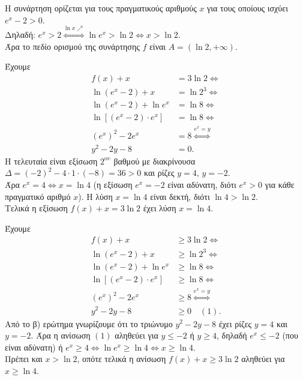 \begin{alist}
\item Η συνάρτηση ορίζεται για τους πραγματικούς αριθμούς $x$ για τους οποίους ισχύει $e^x - 2 > 0$. \\
Δηλαδή: $e^x > 2 \overset{\ln x \nearrow}{\iff} \ln e^x > \ln 2 \Leftrightarrow x > \ln 2$. \\
Άρα το πεδίο ορισμού της συνάρτησης $f$ είναι $A = (\ln 2, +\infty)$.
\item Έχουμε
\begin{align*}
f(x) + x &= 3\ln 2 \Leftrightarrow \\
\ln(e^x - 2) + x &= \ln 2^3 \Leftrightarrow \\
\ln(e^x - 2) + \ln e^x &= \ln 8 \Leftrightarrow \\
\ln\left[(e^x - 2)\cdot e^x\right] &= \ln 8 \Leftrightarrow \\
(e^x)^2 - 2e^x &= 8 \overset{e^x=y}{\iff} \\
y^2 - 2y - 8 &= 0.
\end{align*}
Η τελευταία είναι εξίσωση $2^{\text{ου}}$ βαθμού με διακρίνουσα $\Delta = (-2)^2 - 4\cdot 1\cdot (-8) = 36 > 0$ και ρίζες $y = 4, \, y = -2$. \\
Άρα $e^x = 4 \Leftrightarrow x = \ln 4$ (η εξίσωση $e^x = -2$ είναι αδύνατη, διότι $e^x > 0$ για κάθε πραγματικό αριθμό $x$). Η λύση $x = \ln 4$ είναι δεκτή, διότι $\ln 4 > \ln 2$. \\
Τελικά η εξίσωση $f(x) + x = 3\ln 2$ έχει λύση $x = \ln 4$.
\item Έχουμε
\begin{align*}
f(x) + x &\ge 3\ln 2 \Leftrightarrow \\
\ln(e^x - 2) + x &\ge \ln 2^3 \Leftrightarrow \\
\ln(e^x - 2) + \ln e^x &\ge \ln 8 \Leftrightarrow \\
\ln\left[(e^x - 2)\cdot e^x\right] &\ge \ln 8 \Leftrightarrow \\
(e^x)^2 - 2e^x &\ge 8 \overset{e^x=y}{\iff} \\
y^2 - 2y - 8 &\ge 0 \quad (1).
\end{align*}
Από το β) ερώτημα γνωρίζουμε ότι το τριώνυμο $y^2 - 2y - 8$ έχει ρίζες $y = 4$ και $y = -2$. Άρα η ανίσωση $(1)$ αληθεύει για $y \le -2$ ή $y \ge 4$, δηλαδή $e^x \le -2$ (που είναι αδύνατη) ή $e^x \ge 4 \Leftrightarrow \ln e^x \ge \ln 4 \Leftrightarrow x \ge \ln 4$. \\
Πρέπει και $x > \ln 2$, οπότε τελικά η ανίσωση $f(x) + x \ge 3\ln 2$ αληθεύει για $x \ge \ln 4$.
\end{alist}

